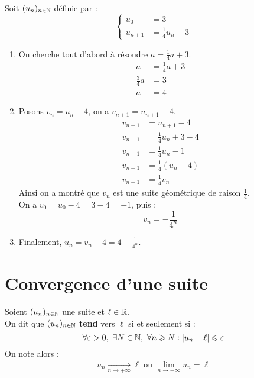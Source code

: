 \begin{example}
	Soit $(u_n)_{n \in \mathbb{N}}$ définie par :
	\[
	\begin{cases}
		u_0 &= 3 \\
		u_{n+1} &= \frac{1}{4} u_n + 3
	\end{cases}
	\]
	\begin{enumerate}
		\item On cherche tout d'abord à résoudre $a = \frac{1}{4} a + 3$.
		\begin{align*}
			a &= \frac{1}{4} a + 3 \\
			\frac{3}{4} a &= 3 \\
			a &= 4
		\end{align*}
		\item Posons $v_n = u_n - 4$, on a $v_{n+1} = u_{n+1} - 4$.
		\begin{align*}
			v_{n+1} &= u_{n+1} - 4 \\
			v_{n+1} &= \frac{1}{4} u_n + 3 - 4 \\
			v_{n+1} &= \frac{1}{4} u_n - 1 \\
			v_{n+1} &= \frac{1}{4} \left( u_n - 4 \right) \\
			v_{n+1} &= \frac{1}{4} v_n
		\end{align*}
		Ainsi on a montré que $v_n$ est une suite géométrique de raison $\frac{1}{4}$.
		\\
		On a $v_0 = u_0 - 4 = 3 - 4 = -1$, puis :
		\[ v_n = -\frac{1}{4^n} \]
		\item Finalement, $u_n = v_n + 4 = 4 - \frac{1}{4^n}$.
	\end{enumerate}
\end{example}

\section{Convergence d'une suite}
\begin{definition}
    Soient $(u_n)_{n \in \mathbb{N}}$ une suite et $\ell \in \mathbb{R}$. 
    \\
    On dit que $(u_n)_{n \in \mathbb{N}}$ \textbf{tend} vers $\ell$ si et seulement si :
    \[ \forall \varepsilon > 0,\ \exists N \in \mathbb{N},\ \forall n \geqslant N : \abs{u_n - \ell} \leqslant \varepsilon \]
    On note alors :
    \begin{align*}
        u_n \xrightarrow[n \to +\infty]{} \ell \text{ ou } \lim_{n \to +\infty} u_n = \ell
    \end{align*}
\end{definition}

